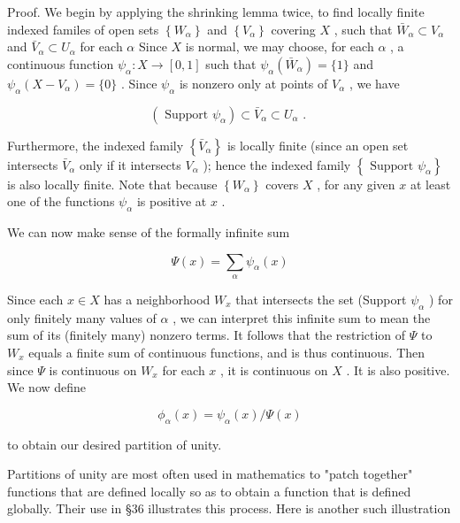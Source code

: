 Proof. We begin by applying the shrinking lemma twice, to find locally finite indexed familes of open sets \(\left\{  {W}_{\alpha }\right\}\) and \(\left\{  {V}_{\alpha }\right\}\) covering \(X\) , such that \({\bar{W}}_{\alpha } \subset  {V}_{\alpha }\) and \({\bar{V}}_{\alpha } \subset  {U}_{\alpha }\) for each \(\alpha\) Since \(X\) is normal, we may choose, for each \(\alpha\) , a continuous function \({\psi }_{\alpha } : X \rightarrow  \left\lbrack  {0,1}\right\rbrack\) such that \({\psi }_{\alpha }\left( {\bar{W}}_{\alpha }\right)  = \{ 1\}\) and \({\psi }_{\alpha }\left( {X - {V}_{\alpha }}\right)  = \{ 0\}\) . Since \({\psi }_{\alpha }\) is nonzero only at points of \({V}_{\alpha }\) , we have

\[
\left( {\text{ Support }{\psi }_{\alpha }}\right)  \subset  {\bar{V}}_{\alpha } \subset  {U}_{\alpha }\text{ . }
\]

Furthermore, the indexed family \(\left\{  {\bar{V}}_{\alpha }\right\}\) is locally finite (since an open set intersects \({\bar{V}}_{\alpha }\) only if it intersects \({V}_{\alpha }\) ); hence the indexed family \(\left\{  {\text{ Support }{\psi }_{\alpha }}\right\}\) is also locally finite. Note that because \(\left\{  {W}_{\alpha }\right\}\) covers \(X\) , for any given \(x\) at least one of the functions \({\psi }_{\alpha }\) is positive at \(x\) .

We can now make sense of the formally infinite sum

\[
\Psi \left( x\right)  = \mathop{\sum }\limits_{\alpha }{\psi }_{\alpha }\left( x\right)
\]

Since each \(x \in  X\) has a neighborhood \({W}_{x}\) that intersects the set (Support \({\psi }_{\alpha }\) ) for only finitely many values of \(\alpha\) , we can interpret this infinite sum to mean the sum of its (finitely many) nonzero terms. It follows that the restriction of \(\Psi\) to \({W}_{x}\) equals a finite sum of continuous functions, and is thus continuous. Then since \(\Psi\) is continuous on \({W}_{x}\) for each \(x\) , it is continuous on \(X\) . It is also positive. We now define

\[
{\phi }_{\alpha }\left( x\right)  = {\psi }_{\alpha }\left( x\right) /\Psi \left( x\right)
\]

to obtain our desired partition of unity.

Partitions of unity are most often used in mathematics to "patch together" functions that are defined locally so as to obtain a function that is defined globally. Their use in §36 illustrates this process. Here is another such illustration

